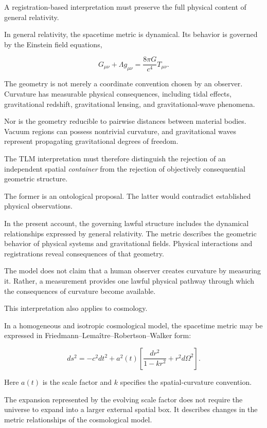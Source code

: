 \documentclass[12pt,onecolumn]{article}
\begin{document}
A registration-based interpretation must preserve the full physical content of general relativity.

In general relativity, the spacetime metric is dynamical. Its behavior is governed by the Einstein field equations,

\begin{equation}
G_{\mu\nu}+\Lambda g_{\mu\nu}
=\frac{8\pi G}{c^4}T_{\mu\nu}.
\end{equation}

The geometry is not merely a coordinate convention chosen by an observer. Curvature has measurable physical consequences, including tidal effects, gravitational redshift, gravitational lensing, and gravitational-wave phenomena.

Nor is the geometry reducible to pairwise distances between material bodies. Vacuum regions can possess nontrivial curvature, and gravitational waves represent propagating gravitational degrees of freedom.

The TLM interpretation must therefore distinguish the rejection of an independent spatial \emph{container} from the rejection of objectively consequential geometric structure.

The former is an ontological proposal. The latter would contradict established physical observations.

In the present account, the governing lawful structure includes the dynamical relationships expressed by general relativity. The metric describes the geometric behavior of physical systems and gravitational fields. Physical interactions and registrations reveal consequences of that geometry.

The model does not claim that a human observer creates curvature by measuring it. Rather, a measurement provides one lawful physical pathway through which the consequences of curvature become available.

This interpretation also applies to cosmology.

In a homogeneous and isotropic cosmological model, the spacetime metric may be expressed in Friedmann--Lema\^{i}tre--Robertson--Walker form:

\begin{equation}
ds^2=-c^2dt^2+
a^2(t)\left[
\frac{dr^2}{1-kr^2}
+r^2d\Omega^2
\right].
\end{equation}

Here $a(t)$ is the scale factor and $k$ specifies the spatial-curvature convention.

The expansion represented by the evolving scale factor does not require the universe to expand into a larger external spatial box. It describes changes in the metric relationships of the cosmological model.
\end{document}

